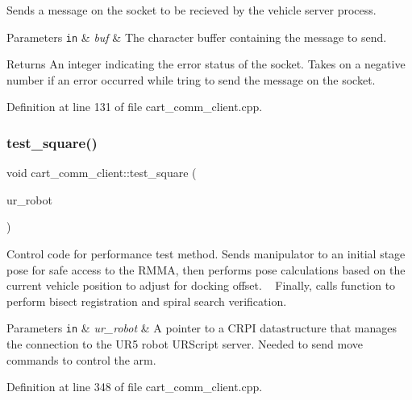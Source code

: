 Sends a message on the socket to be recieved by the vehicle server process. 
\begin{DoxyParams}[1]{Parameters}
\mbox{\tt in}  & {\em buf} & The character buffer containing the message to send. \\
\hline
\end{DoxyParams}
\begin{DoxyReturn}{Returns}
An integer indicating the error status of the socket. Takes on a negative number if an error occurred while tring to send the message on the socket. 
\end{DoxyReturn}


Definition at line 131 of file cart\+\_\+comm\+\_\+client.\+cpp.

\mbox{\label{classcart__comm__client_a0b5e6c07fa231bc4c1475934d90775fe}} 
\subsubsection{\texorpdfstring{test\+\_\+square()}{test\_square()}}
{\footnotesize\ttfamily void cart\+\_\+comm\+\_\+client\+::test\+\_\+square (\begin{DoxyParamCaption}\item[{Crpi\+Robot$<$ Crpi\+Universal $>$ $\ast$}]{ur\+\_\+robot }\end{DoxyParamCaption})}

Control code for performance test method. Sends manipulator to an initial stage pose for safe access to the R\+M\+MA, then performs pose calculations based on the current vehicle position to adjust for docking offset. ~\newline
Finally, calls function to perform bisect registration and spiral search verification. 
\begin{DoxyParams}[1]{Parameters}
\mbox{\tt in}  & {\em ur\+\_\+robot} & A pointer to a C\+R\+PI datastructure that manages the connection to the U\+R5 robot U\+R\+Script server. Needed to send move commands to control the arm. \\
\hline
\end{DoxyParams}


Definition at line 348 of file cart\+\_\+comm\+\_\+client.\+cpp.

\mbox{\label{classcart__comm__client_aaa588482b9a7b89a473bd88125aa833a}} 
